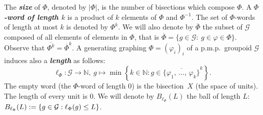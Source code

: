 \documentclass[10pt]{amsart}
\theoremstyle{definition}
\newcommand{\defin}[1]{\textbf{\emph{#1}}}
\newcommand{\Nmath}{\mathbb{N}}
\newcommand{\cg}{\mathcal{G}}
\newcommand{\ph}{\varphi}
\newcommand{\pmp}{p.m.p.\ }
\begin{document}
The \defin{size} of $\Phi$, denoted by $|\Phi|$, is the number of bisections which compose $\Phi$. A \defin{$\Phi$-word of length $k$} is a product of $k$ elements of $\Phi$ and $\Phi^{-1}$. The set of $\Phi$-words of length at most $k$ is denoted by $\Phi^k$. We will also denote by $\overline \Phi$ the subset of $\cg$ composed of all elements of elements in $\Phi$, that is $\overline \Phi=\{g\in \cg:\ g\in\ph\in\Phi\}$. Observe that $\overline{\Phi^k}=\overline{\Phi}^k$. A generating graphing $\Phi=(\ph_i)_i$ of a \pmp groupoid $\cg$ induces also a \defin{length} as follows:
\begin{equation}\label{eq:length}
\ell_\Phi:\cg\rightarrow \Nmath,\ g\mapsto \min\left\lbrace k\in\Nmath: g\in \overline{\{\ph_1,\,\ldots,\,\ph_k\}}^k\right\rbrace.
\end{equation}
The empty word (the $\Phi$-word of length $0$) is the bisection~$X$ (the space of units). The length of every unit is $0$. We will denote by $B_{\ell_\Phi}(L)$ the ball of length $L$: $B_{\ell_\Phi}(L)\linebreak:= \{g \in \cg: \ell_\Phi(g) \leq L\}$.
\end{document}
